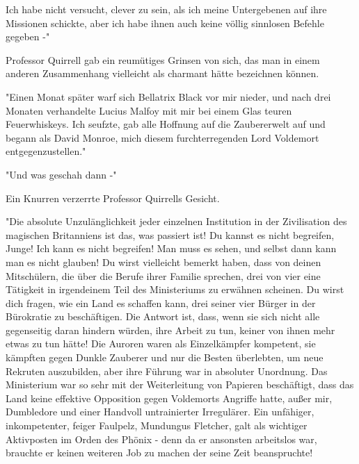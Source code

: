 {Ich habe nicht versucht, clever zu sein, als ich meine Untergebenen auf ihre Missionen schickte, aber ich habe ihnen auch keine völlig sinnlosen Befehle gegeben -"

Professor Quirrell gab ein reumütiges Grinsen von sich, das man in einem anderen Zusammenhang vielleicht als charmant hätte bezeichnen können.

"Einen Monat später warf sich Bellatrix Black vor mir nieder, und nach drei Monaten verhandelte Lucius Malfoy mit mir bei einem Glas teuren Feuerwhiskeys. Ich seufzte, gab alle Hoffnung auf die Zaubererwelt auf und begann als David Monroe, mich diesem furchterregenden Lord Voldemort entgegenzustellen."

"Und was geschah dann -"

Ein Knurren verzerrte Professor Quirrells Gesicht.

"Die absolute Unzulänglichkeit jeder einzelnen Institution in der Zivilisation des magischen Britanniens ist das, was passiert ist! Du kannst es nicht begreifen, Junge! Ich kann es nicht begreifen! Man muss es sehen, und selbst dann kann man es nicht glauben! Du wirst vielleicht bemerkt haben, dass von deinen Mitschülern, die über die Berufe ihrer Familie sprechen, drei von vier eine Tätigkeit in irgendeinem Teil des Ministeriums zu erwähnen scheinen. Du wirst dich fragen, wie ein Land es schaffen kann, drei seiner vier Bürger in der Bürokratie zu beschäftigen. Die Antwort ist, dass, wenn sie sich nicht alle gegenseitig daran hindern würden, ihre Arbeit zu tun, keiner von ihnen mehr etwas zu tun hätte! Die Auroren waren als Einzelkämpfer kompetent, sie kämpften gegen Dunkle Zauberer und nur die Besten überlebten, um neue Rekruten auszubilden, aber ihre Führung war in absoluter Unordnung. Das Ministerium war so sehr mit der Weiterleitung von Papieren beschäftigt, dass das Land keine effektive Opposition gegen Voldemorts Angriffe hatte, außer mir, Dumbledore und einer Handvoll untrainierter Irregulärer. Ein unfähiger, inkompetenter, feiger Faulpelz, Mundungus Fletcher, galt als wichtiger Aktivposten im Orden des Phönix - denn da er ansonsten arbeitslos war, brauchte er keinen weiteren Job zu machen der seine Zeit beanspruchte!

}
